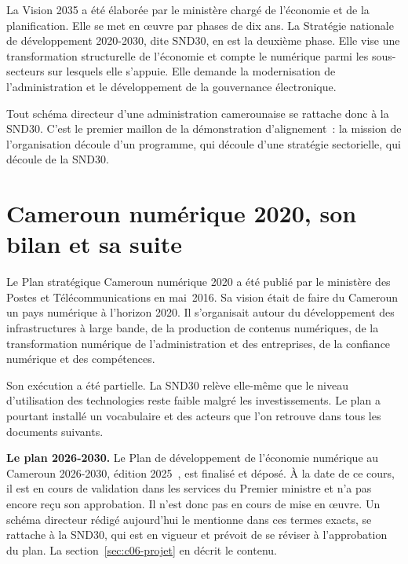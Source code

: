 La Vision 2035 a été élaborée par le ministère chargé de l'économie et de la planification. Elle se met en œuvre
par phases de dix ans. La Stratégie nationale de développement 2020-2030, dite SND30, en est la deuxième phase.
Elle vise une transformation structurelle de l'économie et compte le numérique parmi les sous-secteurs sur
lesquels elle s'appuie. Elle demande la modernisation de l'administration et le développement de la
gouvernance électronique.

Tout schéma directeur d'une administration camerounaise se rattache donc à la SND30. C'est le premier maillon de
la démonstration d'alignement~: la mission de l'organisation découle d'un programme, qui découle d'une stratégie
sectorielle, qui découle de la SND30.

\section{Cameroun numérique 2020, son bilan et sa suite}
\label{sec:c06-plan}

Le Plan stratégique Cameroun numérique 2020 a été publié par le ministère des Postes et Télécommunications en
mai~2016. Sa vision était de faire du Cameroun un pays numérique à l'horizon 2020. Il s'organisait autour du
développement des infrastructures à large bande, de la production de contenus numériques, de la transformation
numérique de l'administration et des entreprises, de la confiance numérique et des compétences.

Son exécution a été partielle. La SND30 relève elle-même que le niveau d'utilisation des technologies reste
faible malgré les investissements. Le plan a pourtant installé un vocabulaire et des acteurs que l'on retrouve
dans tous les documents suivants.

\begin{boxinfo}
\textbf{Le plan 2026-2030.} Le Plan de développement de l'économie numérique au Cameroun 2026-2030, édition
2025~\cite{pden2026}, est finalisé et déposé. À la date de ce cours, il est en cours de validation dans les
services du Premier ministre et n'a pas encore reçu son approbation. Il n'est donc pas en cours de mise en
œuvre. Un schéma directeur rédigé aujourd'hui le mentionne dans ces termes exacts, se rattache à la SND30, qui
est en vigueur et prévoit de se réviser à l'approbation du plan. La section~\ref{sec:c06-projet} en décrit le
contenu.
\end{boxinfo}


